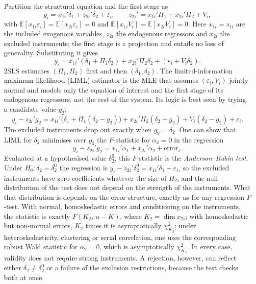\documentclass[11pt,a4paper]{article}
\newcommand{\E}{\mathbb{E}}
\begin{document}
Partition the structural equation and the first stage as
\[
y_i=x_{1i}'\delta_1+z_{2i}'\delta_2+\varepsilon_i,\qquad z_{2i}'=x_{1i}'\Pi_1+x_{2i}'\Pi_2+V_i,
\]
with $\E[x_{1i}\varepsilon_i]=\E[x_{2i}\varepsilon_i]=0$ and $\E[x_{1i}V_i]=\E[x_{2i}V_i]=0$. Here $x_{1i}=z_{1i}$ are the included exogenous variables, $z_{2i}$ the endogenous regressors and $x_{2i}$ the excluded instruments; the first stage is a projection and entails no loss of generality. Substituting it gives
\[
y_i=x_{1i}'(\delta_1+\Pi_1\delta_2)+x_{2i}'\Pi_2\delta_2+(\varepsilon_i+V_i\delta_2).
\]
2SLS estimates $(\Pi_1,\Pi_2)$ first and then $(\delta_1,\delta_2)$. The limited-information maximum likelihood (LIML) estimator is the MLE that assumes $(\varepsilon_i,V_i)$ jointly normal and models only the equation of interest and the first stage of its endogenous regressors, not the rest of the system. Its logic is best seen by trying a candidate value $g_2$:
\[
y_i-z_{2i}'g_2=x_{1i}'\big(\delta_1+\Pi_1(\delta_2-g_2)\big)+x_{2i}'\Pi_2(\delta_2-g_2)+V_i(\delta_2-g_2)+\varepsilon_i .
\]
The excluded instruments drop out exactly when $g_2=\delta_2$. One can show that LIML for $\delta_2$ minimises over $g_2$ the $F$-statistic for $\alpha_2=0$ in the regression
\[
y_i-z_{2i}'g_2=x_{1i}'\alpha_1+x_{2i}'\alpha_2+\text{error}_i .
\]
Evaluated at a hypothesised value $\delta_2^0$, this $F$-statistic is the \emph{Anderson--Rubin test}. Under $H_0\colon\delta_2=\delta_2^0$ the regression is $y_i-z_{2i}'\delta_2^0=x_{1i}'\delta_1+\varepsilon_i$, so the excluded instruments have zero coefficients whatever the size of $\Pi_2$, and the null distribution of the test does not depend on the strength of the instruments. What that distribution is depends on the error structure, exactly as for any regression $F$-test. With normal, homoskedastic errors and conditioning on the instruments, the statistic is exactly $F(K_2,\,n-K)$, where $K_2=\dim x_{2i}$; with homoskedastic but non-normal errors, $K_2$ times it is asymptotically $\chi^2_{K_2}$; under heteroskedasticity, clustering or serial correlation, one uses the corresponding robust Wald statistic for $\alpha_2=0$, which is asymptotically $\chi^2_{K_2}$. In every case, validity does not require strong instruments. A rejection, however, can reflect either $\delta_2\neq\delta_2^0$ or a failure of the exclusion restrictions, because the test checks both at once.
\end{document}
